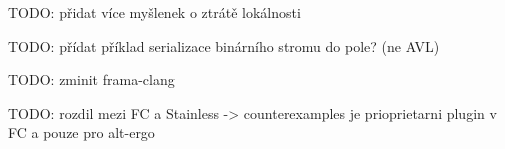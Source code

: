 TODO: přidat více myšlenek o ztrátě lokálnosti

TODO: přídat příklad serializace binárního stromu do pole? (ne AVL)








TODO: zminit frama-clang


TODO: rozdil mezi FC a Stainless -> counterexamples je prioprietarni plugin v FC a pouze pro alt-ergo
